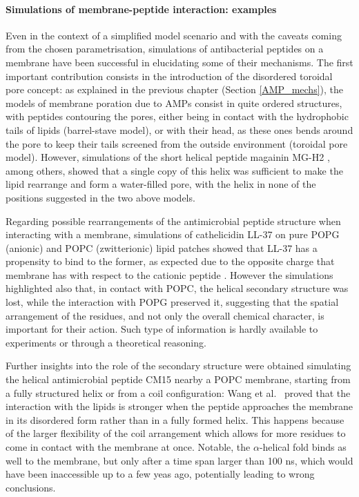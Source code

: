 \paragraph{Simulations of membrane-peptide interaction: examples} Even in the context of a simplified model scenario and with the caveats coming from the chosen parametrisation, simulations of antibacterial peptides on a membrane have been successful in elucidating some of their mechanisms.
%
The first important contribution consists in the introduction of the disordered toroidal pore concept: as explained in the previous chapter (Section \ref{AMP_mechs}), the models of membrane poration due to AMPs consist in quite ordered structures, with peptides contouring the pores, either being in contact with the hydrophobic tails of lipids (barrel-stave model), or with their head, as these ones bends around the pore to keep their tails screened from the outside environment (toroidal pore model). However, simulations of the short helical peptide magainin MG-H2 \cite{Leontiadou2006}, among others, showed that a single copy of this helix was sufficient to make the lipid rearrange and form a water-filled pore, with the helix in none of the positions suggested in the two above models.

Regarding possible rearrangements of the antimicrobial peptide structure when interacting with a membrane, simulations of cathelicidin LL-37 on pure POPG (anionic) and POPC (zwitterionic) lipid patches showed that LL-37 has a propensity to bind to the former, as expected due to the opposite charge that membrane has with respect to the cationic peptide \cite{Zhao2018}. However the simulations highlighted also that, in contact with POPC, the helical secondary structure was lost, while the interaction with POPG preserved it, suggesting that the spatial arrangement of the residues, and not only the overall chemical character, is important for their action. Such type of information is hardly available to experiments or through a theoretical reasoning.

Further insights into the role of the secondary structure were obtained simulating the helical antimicrobial peptide CM15 nearby a POPC membrane, starting from a fully structured helix or from a coil configuration: Wang et al.\ \cite{Wang2012} proved that the interaction with the lipids is stronger when the peptide approaches the membrane in its disordered form rather than in a fully formed helix. This happens because of the larger flexibility of the coil arrangement which allows for more residues to come in contact with the membrane at once. Notable, the $\alpha$-helical fold binds as well to the membrane, but only after a time span larger than 100 ns, which would have been inaccessible up to a few yeas ago, potentially leading to wrong conclusions.

